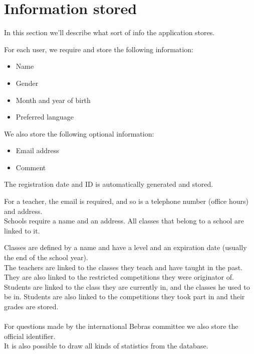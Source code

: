 
\section{Information stored}
In this section we'll describe what sort of info the application stores.

For each user, we require and store the following information:\\
\begin{itemize}
\item Name
\item Gender
\item Month and year of birth
\item Preferred language
\end{itemize} 


We also store the following optional information:
\begin{itemize}
\item Email address
\item Comment
\end{itemize}


The registration date and ID is automatically generated and stored.

For a teacher, the email is required, and so is a telephone number (office hours) and address.
\\
Schools require a name and an address. All classes that belong to a school are linked to it.

Classes are defined by a name and have a level and an expiration date (usually the end of the school year). \\

The teachers are linked to the classes they teach and have taught in the past. They are also linked to the restricted competitions they were originator of. Students are linked to the class they are currently in, and the classes he used to be in. Students are also linked to the competitions they took part in and their grades are stored. 
\\ \\
For questions made by the international Bebras committee we also store the official identifier.\\
It is also possible to draw all kinds of statistics from the database.
